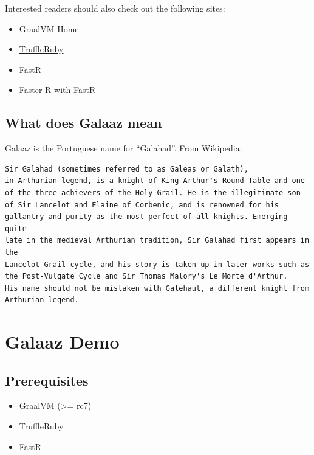 \documentclass[11pt,]{article}
\providecommand{\tightlist}{%
  \setlength{\itemsep}{0pt}\setlength{\parskip}{0pt}}
\begin{document}
Interested readers should also check out the following sites:

\begin{itemize}
\tightlist
\item
  \href{https://www.graalvm.org/}{GraalVM Home}
\item
  \href{https://github.com/oracle/truffleruby}{TruffleRuby}
\item
  \href{https://github.com/oracle/fastr}{FastR}
\item
  \href{https://medium.com/graalvm/faster-r-with-fastr-4b8db0e0dceb}{Faster
  R with FastR}
\end{itemize}

\hypertarget{what-does-galaaz-mean}{%
\subsection{What does Galaaz mean}\label{what-does-galaaz-mean}}

Galaaz is the Portuguese name for ``Galahad''. From Wikipedia:

\begin{verbatim}
Sir Galahad (sometimes referred to as Galeas or Galath),
in Arthurian legend, is a knight of King Arthur's Round Table and one
of the three achievers of the Holy Grail. He is the illegitimate son
of Sir Lancelot and Elaine of Corbenic, and is renowned for his
gallantry and purity as the most perfect of all knights. Emerging quite
late in the medieval Arthurian tradition, Sir Galahad first appears in the
Lancelot–Grail cycle, and his story is taken up in later works such as
the Post-Vulgate Cycle and Sir Thomas Malory's Le Morte d'Arthur.
His name should not be mistaken with Galehaut, a different knight from
Arthurian legend. 
\end{verbatim}

\hypertarget{galaaz-demo}{%
\section{Galaaz Demo}\label{galaaz-demo}}

\hypertarget{prerequisites}{%
\subsection{Prerequisites}\label{prerequisites}}

\begin{itemize}
\tightlist
\item
  GraalVM (\textgreater{}= rc7)
\item
  TruffleRuby
\item
  FastR
\end{itemize}
\end{document}
